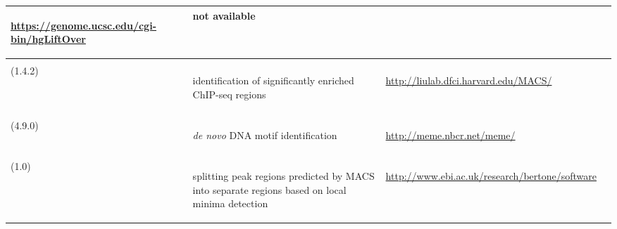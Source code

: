 \begin{singlespacing}
\begin{small}
\begin{longtable}{>{\textsf\bgroup\raggedleft\arraybackslash}p{2.7cm}<{\egroup} >{\textsf\bgroup}p{4.5cm}<{\egroup} >{\textsf\bgroup}p{4.2cm}<{\egroup}>{\textsf\bgroup}p{2.3cm}<{\egroup}}
\begin{minipage}{4.2cm}
				\url{https://genome.ucsc.edu/cgi-bin/hgLiftOver}
			\end{minipage} 
				&  not available
\tabularnewline \midrule
 \begin{minipage}{2.7cm}
				\textbf{MACS}\\
					(1.4.2)
				\end{minipage}
			&	 \begin{minipage}{4.5cm}
				identification of significantly enriched ChIP-seq regions
			\end{minipage} 
			&  \begin{minipage}{4.2cm}
				\url{http://liulab.dfci.harvard.edu/MACS/}
			\end{minipage} 
				&  \begin{minipage}{2.3cm}
		\citet{Zhang2008}
			\end{minipage} 
\tabularnewline \midrule
 \begin{minipage}{2.7cm}
				\textbf{MEME}\\
					(4.9.0)
				\end{minipage} 
			&  \begin{minipage}{4.5cm}
				\textit{de novo} DNA motif identification
			\end{minipage}
			&  \begin{minipage}{4.2cm}
				\url{http://meme.nbcr.net/meme/}
			\end{minipage} 
					&  \begin{minipage}{2.3cm}
		\raggedright  \citet{Bailey1994, Machanick2011}
			\end{minipage} 
\tabularnewline \midrule
\begin{minipage}{2.7cm}
				\textbf{PeakSplitter}\\
					(1.0)
				\end{minipage} 
			&  \begin{minipage}{4.5cm}
				splitting peak regions predicted by MACS into separate regions based on local minima detection
			\end{minipage} 
			&  \begin{minipage}{4.2cm}
				\url{http://www.ebi.ac.uk/research/bertone/software}

\end{minipage}
\end{longtable}
\end{small}
\end{singlespacing}
